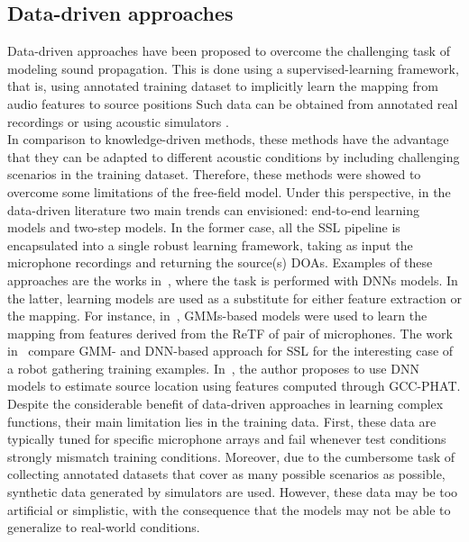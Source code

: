 \subsection{Data-driven approaches}
Data-driven approaches have been proposed to overcome the challenging task of modeling sound propagation.
This is done using a supervised-learning framework, that is, using annotated training dataset to implicitly learn the mapping from audio features to source positions
Such data can be obtained from annotated real recordings  or using acoustic simulators .
\\In comparison to knowledge-driven methods, these methods have the advantage that they can be adapted to different acoustic conditions by including challenging scenarios in the training dataset.
Therefore, these methods were showed to overcome some limitations of the free-field model.
Under this perspective, in the data-driven literature two main trends can envisioned: end-to-end learning models and two-step models.
In the former case, all the \ac{SSL} pipeline is encapsulated into a single robust learning framework, taking as input the microphone recordings and returning the source(s) \acp{DOA}.
Examples of these approaches are the works in~, where the task is performed with \acp{DNN} models.
In the latter, learning models are used as a substitute for either feature extraction or the mapping.
For instance, in~, \acp{GMM}-based models were used to learn the mapping from features derived from the \ac{ReTF} of pair of microphones.
The work in~ compare \ac{GMM}- and \ac{DNN}-based approach for \ac{SSL} for the interesting case of a robot gathering training examples.
In~, the author proposes to use \ac{DNN} models to estimate source location using features computed through \ac{GCC-PHAT}.
\\Despite the considerable  benefit of data-driven approaches in learning complex functions, their main limitation lies in the training data.
First, these data are typically tuned for specific microphone arrays and fail whenever test conditions strongly mismatch training conditions.
Moreover, due to the cumbersome task of collecting annotated datasets that cover as many possible scenarios as possible, synthetic data generated by simulators are used.
However, these data may be too artificial or simplistic, with the consequence that the models may not be able to generalize to real-world conditions.


